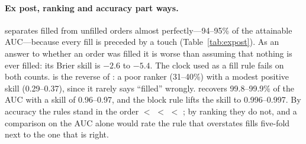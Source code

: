 \paragraph{Ex post, ranking and accuracy part ways.}
\touch{} separates filled from unfilled orders almost perfectly---94--95\% of the
attainable AUC---because every fill is preceded by a touch
(Table~\ref{tab:expost}). As an answer to whether an order was filled it is worse
than assuming that nothing is ever filled: its Brier skill is $-2.6$ to $-5.4$.
The clock used as a fill rule fails on both counts. \vt{} is the reverse of
\touch: a poor ranker (31--40\%) with a modest positive skill (0.29--0.37), since
it rarely says ``filled'' wrongly. \qa{} recovers 99.8--99.9\% of the AUC with a
skill of 0.96--0.97, and the block rule lifts the skill to 0.996--0.997. By
accuracy the rules stand in the order \touch{} $<$ \clock{} $<$ \vt{} $<$ \qa; by
ranking they do not, and a comparison on the AUC alone would rate the rule that
overstates fills five-fold next to the one that is right.
